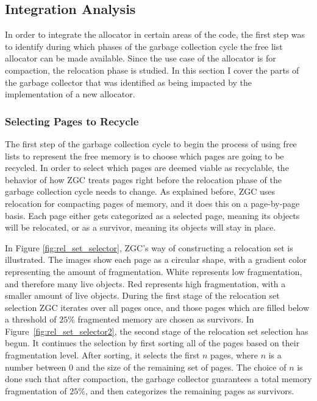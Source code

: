 \subsection{Integration Analysis}
In order to integrate the allocator in certain areas of the code, the first step was to identify during which phases of the garbage collection cycle the free list allocator can be made available. Since the use case of the allocator is for compaction, the relocation phase is studied. In this section I cover the parts of the garbage collector that was identified as being impacted by the implementation of a new allocator.

\subsubsection{Selecting Pages to Recycle}
The first step of the garbage collection cycle to begin the process of using free lists to represent the free memory is to choose which pages are going to be recycled. In order to select which pages are deemed viable as recyclable, the behavior of how ZGC treats pages right before the relocation phase of the garbage collection cycle needs to change. As explained before, ZGC uses relocation for compacting pages of memory, and it does this on a page-by-page basis. Each page either gets categorized as a selected page, meaning its objects will be relocated, or as a survivor, meaning its objects will stay in place. 

In Figure \ref{fig:rel_set_selector}, ZGC's way of constructing a relocation set is illustrated. The images show each page as a circular shape, with a gradient color representing the amount of fragmentation. White represents low fragmentation, and therefore many live objects. Red represents high fragmentation, with a smaller amount of live objects. During the first stage of the relocation set selection ZGC iterates over all pages once, and those pages which are filled below a threshold of $25\%$ fragmented memory are chosen as survivors. In Figure~\ref{fig:rel_set_selector2}, the second stage of the relocation set selection has begun. It continues the selection by first sorting all of the pages based on their fragmentation level. After sorting, it selects the first $n$ pages, where $n$ is a number between 0 and the size of the remaining set of pages. The choice of $n$ is done such that after compaction, the garbage collector guarantees a total memory fragmentation of $25\%$, and then categorizes the remaining pages as survivors.

